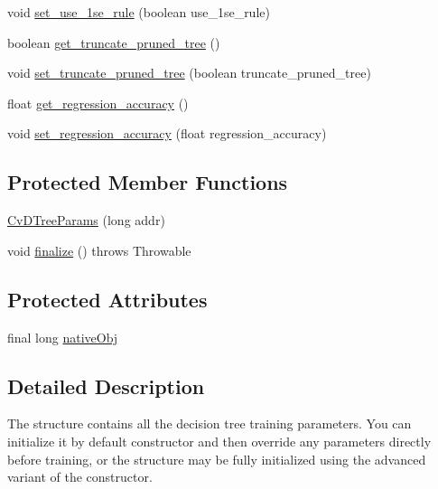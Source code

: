 \begin{DoxyCompactItemize}
void \mbox{\hyperlink{classorg_1_1opencv_1_1ml_1_1_cv_d_tree_params_aa2db561f4d8d13460a08e2702a35f955}{set\+\_\+use\+\_\+1se\+\_\+rule}} (boolean use\+\_\+1se\+\_\+rule)
\item 
boolean \mbox{\hyperlink{classorg_1_1opencv_1_1ml_1_1_cv_d_tree_params_a4aa9c41da88691fa1e47cc5a40e38bb9}{get\+\_\+truncate\+\_\+pruned\+\_\+tree}} ()
\item 
void \mbox{\hyperlink{classorg_1_1opencv_1_1ml_1_1_cv_d_tree_params_abc931dca8b9348b1dbaf20cbfb702df8}{set\+\_\+truncate\+\_\+pruned\+\_\+tree}} (boolean truncate\+\_\+pruned\+\_\+tree)
\item 
float \mbox{\hyperlink{classorg_1_1opencv_1_1ml_1_1_cv_d_tree_params_a5dba25c096276cce007e41d2e0655dd0}{get\+\_\+regression\+\_\+accuracy}} ()
\item 
void \mbox{\hyperlink{classorg_1_1opencv_1_1ml_1_1_cv_d_tree_params_aa1cd9a553f2b0036f2237c9edc27d4d3}{set\+\_\+regression\+\_\+accuracy}} (float regression\+\_\+accuracy)
\end{DoxyCompactItemize}
\subsection*{Protected Member Functions}
\begin{DoxyCompactItemize}
\item 
\mbox{\hyperlink{classorg_1_1opencv_1_1ml_1_1_cv_d_tree_params_a1fc8dc4b54118241faa7e09db396a22d}{Cv\+D\+Tree\+Params}} (long addr)
\item 
void \mbox{\hyperlink{classorg_1_1opencv_1_1ml_1_1_cv_d_tree_params_a7eb1b8c252c7b6e2287d3d42be1137ba}{finalize}} ()  throws Throwable 
\end{DoxyCompactItemize}
\subsection*{Protected Attributes}
\begin{DoxyCompactItemize}
\item 
final long \mbox{\hyperlink{classorg_1_1opencv_1_1ml_1_1_cv_d_tree_params_a7dac017cdb59af8aa6880a6a21366ef5}{native\+Obj}}
\end{DoxyCompactItemize}


\subsection{Detailed Description}
The structure contains all the decision tree training parameters. You can initialize it by default constructor and then override any parameters directly before training, or the structure may be fully initialized using the advanced variant of the constructor.

